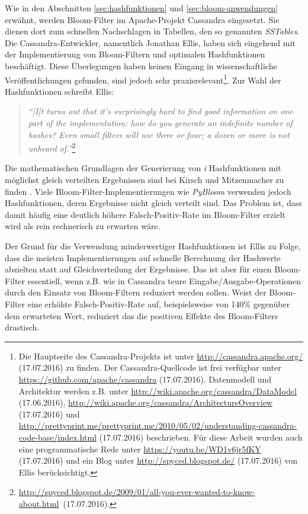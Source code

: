 Wie in den Abschnitten \ref{sec:hashfunktionen} und \ref{sec:bloom-anwendungen} erwähnt, werden Bloom-Filter im Apache-Projekt Cassandra eingesetzt. Sie dienen dort zum schnellen Nachschlagen in Tabellen, den so genannten \textit{SSTables}. Die Cassandra-Entwickler, namentlich Jonathan Ellis, haben sich eingehend mit der Implementierung von Bloom-Filtern und optimalen Hashfunktionen beschäftigt. Diese Überlegungen haben keinen Eingang in wissenschaftliche Veröffentlichungen gefunden, sind jedoch sehr praxisrelevant\footnote{Die Hauptseite des Cassandra-Projekts ist unter \url{http://cassandra.apache.org/} (17.07.2016) zu finden. Der Cassandra-Quellcode ist frei verfügbar unter \url{https://github.com/apache/cassandra} (17.07.2016). Datenmodell und Architektur werden z.B. unter \url{http://wiki.apache.org/cassandra/DataModel} (17.06.2016), \url{http://wiki.apache.org/cassandra/ArchitectureOverview} (17.07.2016) und \url{http://prettyprint.me/prettyprint.me/2010/05/02/understanding-cassandra-code-base/index.html} (17.07.2016) beschrieben. Für diese Arbeit wurden auch eine  programmatische Rede unter \url{https://youtu.be/WD1v6jr5fKY} (17.07.2016) und ein Blog unter \url{http://spyced.blogspot.de/} (17.07.2016) von Ellis berücksichtigt.}. Zur Wahl der Hashfunktionen schreibt Ellis: 
\begin{quote}
\textit{"`[I]t turns out that it's surprisingly hard to find good information on one part of the implementation: how do you generate an indefinite number of hashes? Even small filters will use three or four; a dozen or more is not unheard of."'}\footnote{\mbox{\url{http://spyced.blogspot.de/2009/01/all-you-ever-wanted-to-know-about.html} (17.07.2016).}} 
\end{quote}
Die mathematischen Grundlagen der Generierung von \textit{i} Hashfunktionen mit möglichst gleich verteilten Ergebnissen sind bei Kirsch und Mitzenmacher zu finden \cite{Kirsch2006}. Viele Bloom-Filter-Implementierungen wie \textit{PyBloom} verwenden jedoch Hashfunktionen, deren Ergebnisse nicht gleich verteilt sind. Das Problem ist, dass damit häufig eine deutlich höhere Falsch-Positiv-Rate im Bloom-Filter erzielt wird als rein rechnerisch zu erwarten wäre. 

Der Grund für die Verwendung minderwertiger Hashfunktionen ist Ellis zu Folge, dass die meisten Implementierungen auf schnelle Berechnung der Hashwerte abzielten statt auf Gleichverteilung der Ergebnisse. Das ist aber für einen Bloom-Filter essentiell, wenn z.B. wie in Cassandra teure Eingabe/Ausgabe-Operationen durch den Einsatz von Bloom-Filtern reduziert werden sollen. Weist der Bloom-Filter eine erhöhte Falsch-Positiv-Rate auf, beispielsweise von 140\% gegenüber dem erwarteten Wert, reduziert das die positiven Effekte des Bloom-Filters drastisch.  

